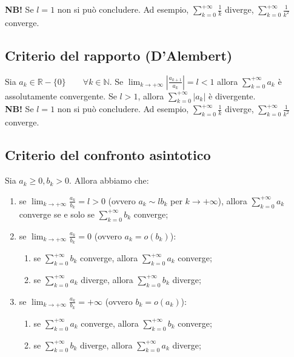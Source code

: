 \documentclass{article}
\begin{document}
\noindent\textbf{NB!} Se $l = 1$ non si può concludere. Ad esempio, $\sum_{k = 0}^{+\infty} \frac{1}{k}$ diverge, $\sum_{k = 0}^{+\infty} \frac{1}{k^2}$ converge.

\subsection{Criterio del rapporto (D'Alembert)}
Sia $a_k \in \mathbb{R} - \{0\} \qquad \forall k \in \mathbb{N}$. Se $\lim_{k \to +\infty} |\frac{a_{k + 1}}{a_k}| = l < 1$ allora $\sum_{k = 0}^{+\infty} a_k$ è assolutamente convergente. Se $l > 1$, allora $\sum_{k = 0}^{+\infty} |a_k|$ è divergente.\\

\noindent\textbf{NB!} Se $l = 1$ non si può concludere. Ad esempio, $\sum_{k = 0}^{+\infty} \frac{1}{k}$ diverge, $\sum_{k = 0}^{+\infty} \frac{1}{k^2}$ converge.

\subsection{Criterio del confronto asintotico}
Sia $a_k \geq 0, b_k > 0$. Allora abbiamo che:
\begin{enumerate}
    \item se $\lim_{k \to +\infty} \frac{a_k}{b_k} = l > 0$ (ovvero $a_k \sim lb_k$ per $k \to +\infty$), allora $\sum_{k = 0}^{+\infty} a_k$ converge se e solo se $\sum_{k = 0}^{+\infty} b_k$ converge;
    \item se $\lim_{k \to +\infty} \frac{a_k}{b_k} = 0$ (ovvero $a_k = o(b_k)$): 
    \begin{enumerate}
        \item se $\sum_{k = 0}^{+\infty} b_k$ converge, allora $\sum_{k = 0}^{+\infty} a_k$ converge;
        \item se $\sum_{k = 0}^{+\infty} a_k$ diverge, allora $\sum_{k = 0}^{+\infty} b_k$ diverge;
    \end{enumerate}
    \item se $\lim_{k \to +\infty} \frac{a_k}{b_k} = +\infty$ (ovvero $b_k = o(a_k)$): 
    \begin{enumerate}
        \item se $\sum_{k = 0}^{+\infty} a_k$ converge, allora $\sum_{k = 0}^{+\infty} b_k$ converge;
        \item se $\sum_{k = 0}^{+\infty} b_k$ diverge, allora $\sum_{k = 0}^{+\infty} a_k$ diverge;
    \end{enumerate}
\end{enumerate}
\end{document}
